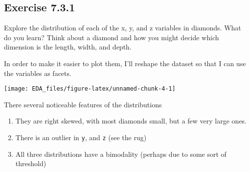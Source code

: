 \documentclass[]{book}
\newenvironment{Shaded}{\begin{snugshade}}{\end{snugshade}}
\newcommand{\DataTypeTok}[1]{\textcolor[rgb]{0.13,0.29,0.53}{#1}}
\newcommand{\KeywordTok}[1]{\textcolor[rgb]{0.13,0.29,0.53}{\textbf{#1}}}
\newcommand{\NormalTok}[1]{#1}
\newcommand{\OperatorTok}[1]{\textcolor[rgb]{0.81,0.36,0.00}{\textbf{#1}}}
\newcommand{\StringTok}[1]{\textcolor[rgb]{0.31,0.60,0.02}{#1}}
\providecommand{\tightlist}{%
  \setlength{\itemsep}{0pt}\setlength{\parskip}{0pt}}
\theoremstyle{plain}
\theoremstyle{remark}
\begin{document}
\hypertarget{exercise-7.3.1}{%
\subsection*{\texorpdfstring{Exercise
{7.3.1}}{Exercise 7.3.1}}\label{exercise-7.3.1}}

Explore the distribution of each of the x, y, and z variables in
diamonds. What do you learn? Think about a diamond and how you might
decide which dimension is the length, width, and depth.

In order to make it easier to plot them, I'll reshape the dataset so
that I can use the variables as facets.

\begin{Shaded}
\end{Shaded}

\begin{center}\texttt{[image: EDA\_files/figure-latex/unnamed-chunk-4-1]} \end{center}

There several noticeable features of the distributions

\begin{enumerate}
\def\labelenumi{\arabic{enumi}.}
\tightlist
\item
  They are right skewed, with most diamonds small, but a few very large
  ones.
\item
  There is an outlier in \texttt{y}, and \texttt{z} (see the rug)
\item
  All three distributions have a bimodality (perhaps due to some sort of
  threshold)
\end{enumerate}
\end{document}
